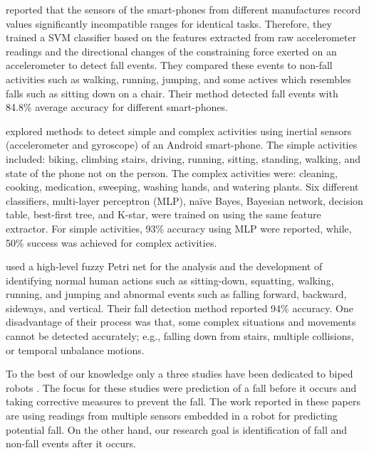 \documentclass{IEEEtran}
\begin{document}
\cite{steidlFallDetection2012} reported that the sensors of the smart-phones from different manufactures 
record values significantly incompatible ranges for identical tasks. Therefore, they trained a SVM 
classifier based on the features extracted from raw accelerometer readings and the directional 
changes of the constraining force exerted on an accelerometer to detect fall events. They compared 
these events to non-fall activities such as walking, running, jumping, and some actives which 
resembles falls such as sitting down on a chair. Their method detected fall events with 84.8\% average 
accuracy for different smart-phones. 

\cite{DernbachActivityAndFallDetectionPhone2012} explored methods to detect simple and complex activities using inertial 
sensors (accelerometer and gyroscope) of an Android smart-phone. The simple activities included: 
biking, climbing stairs, driving, running, sitting, standing, walking, and state of the phone not 
on the person. The complex activities were: cleaning, cooking, medication, sweeping, washing hands, 
and watering plants. Six different classifiers, multi-layer  perceptron (MLP), na\"{i}ve  Bayes,  
Bayesian  network,  decision  table,  best-first tree, and  K-star,  were trained on using the same 
feature extractor. For simple activities, 93\% accuracy using MLP were reported, while, 50\% 
success was achieved for complex activities.    

\cite{ShenFallDetectionPhone2015} used a  high-level fuzzy Petri net for the analysis and the development of 
identifying normal human actions such as sitting-down, squatting, walking, running, and jumping and 
abnormal events such as falling forward, backward, sideways, and vertical. Their fall detection 
method reported 94\% accuracy. One disadvantage of their process was that, some complex situations 
and movements cannot be detected accurately; e.g., falling down from  stairs, multiple collisions, 
or temporal unbalance motions.

\par 
To the 
best of our knowledge only a three studies have been dedicated to biped robots \cite{Andre2015,Goswami2014,Moya2015}. The focus for these studies were prediction of a fall before it occurs and taking corrective measures to prevent the fall. The work reported in these papers are using readings from multiple sensors embedded in a robot for predicting potential fall. On the other hand, our research goal is identification of fall and non-fall events after it occurs.
\end{document}
